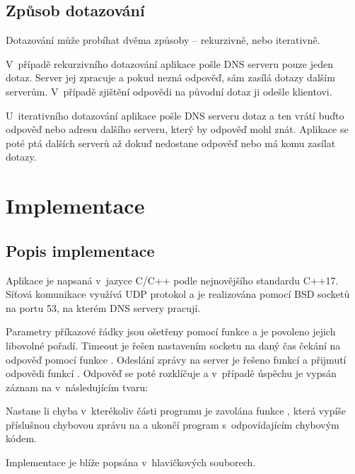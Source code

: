\documentclass[11pt, a4paper, titlepage]{article}
\begin{document}
	\subsection{Způsob dotazování}

	Dotazování může probíhat dvěma způsoby -- rekurzivně, nebo iterativně.
	\medskip

	V~případě rekurzivního dotazování aplikace pošle DNS serveru pouze jeden dotaz. Server jej zpracuje a pokud nezná odpověď, sám zasílá dotazy dalším serverům. V~případě zjištění odpovědi na původní dotaz ji odešle klientovi.
	\medskip

	U~iterativního dotazování aplikace pošle DNS serveru dotaz a ten vrátí buďto odpověď nebo adresu dalšího serveru, který by odpověď mohl znát. Aplikace se poté ptá dalších serverů až dokuď nedostane odpověď nebo má komu zasílat dotazy.



\section{Implementace}

	\subsection{Popis implementace}

	Aplikace je napsaná v~jazyce C/C++ podle nejnovějšího standardu C++17. Síťová komunikace využívá UDP protokol a je realizována pomocí BSD socketů na portu 53, na kterém DNS servery pracují.

	Parametry příkazové řádky jsou ošetřeny pomocí funkce  a je povoleno jejich libovolné pořadí. Timeout je řešen nastavením socketu na daný čas čekání na odpověď pomocí funkce . Odeslání zprávy na server je řešeno funkcí  a přijmutí odpovědi funkcí . Odpověď se poté rozklíčuje a v~případě úspěchu je vypsán záznam na  v~následujícím tvaru:

	\begin{center}
	\end{center}

	Nastane li chyba v~kterékoliv části programu je zavolána funkce , která vypíše příslušnou chybovou zprávu na  a ukončí program s~odpovídajícím chybovým kódem.
	\medskip

	Implementace je blíže popsána v~hlavičkových souborech.
\end{document}

